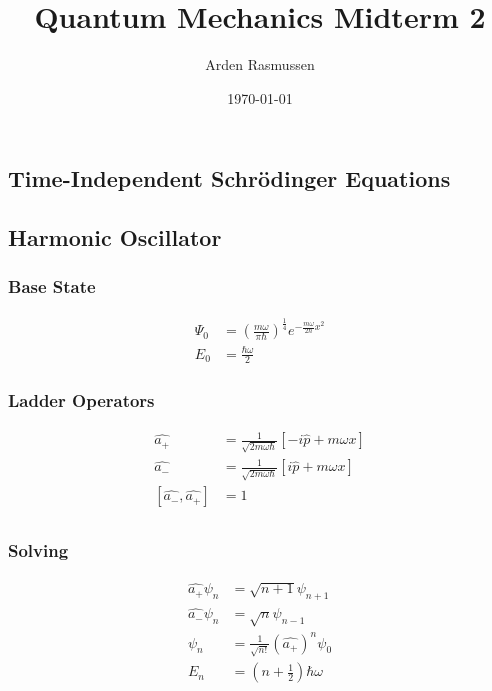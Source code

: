 \documentclass[10pt]{amsart}
\title{Quantum Mechanics Midterm 2}
\author{Arden Rasmussen}
\date{\today}
\begin{document}
\maketitle
\begin{multicols}{2}

\section{Time-Independent Schr\"odinger Equations}%
\label{sec:time_independent_schr"odinger_equations}

\subsection{Harmonic Oscillator}%
\label{sub:harmonic_oscillator}

\subsubsection{Base State}%
\label{ssub:base_state}

\begin{align*}
  \Psi_0&={\left(\frac{m\omega}{\pi\hbar}\right)}^{\frac{1}{4}}e^{-\frac{m\omega}{2\hbar}x^2}\\
  E_0&=\frac{\hbar\omega}{2}
\end{align*}

\subsubsection{Ladder Operators}%
\label{ssub:ladder_operators}

\begin{align*}
  \hat{a_{+}}&=\frac{1}{\sqrt{2m\omega\hbar}}\left[-i\hat{p}+m\omega x\right]\\
  \hat{a_{-}}&=\frac{1}{\sqrt{2m\omega\hbar}}\left[i\hat{p}+m\omega x\right]\\
  \left[\hat{a_{-}},\hat{a_{+}}\right]&=1\\
\end{align*}

\subsubsection{Solving}%
\label{ssub:solving}

\begin{align*}
  \hat{a_{+}}\psi_n&=\sqrt{n+1}\psi_{n+1}\\
  \hat{a_{-}}\psi_n&=\sqrt{n}\psi_{n-1}\\
  \psi_n&=\frac{1}{\sqrt{n!}}{\left(\hat{a_{+}}\right)}^n\psi_0\\
  E_n&=\left(n+\frac{1}{2}\right)\hbar\omega
\end{align*}


\end{multicols}
\end{document}
